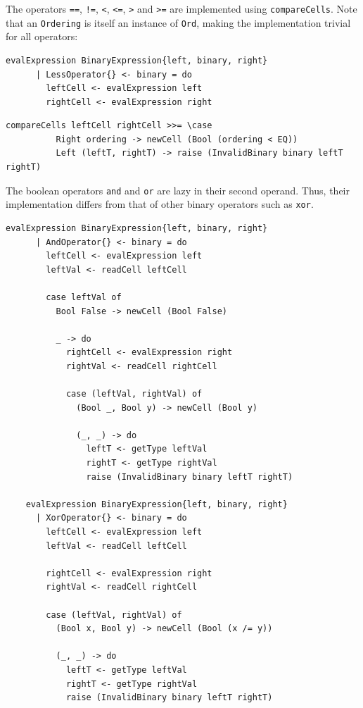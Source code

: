 \documentclass[UdineBachThesis,american,11pt]{PhdThesis}
\begin{document}
  The operators \mbox{\texttt{==}}, \mbox{\texttt{!=}}, \texttt{<},
  \mbox{\texttt{<=}}, \texttt{>} and \mbox{\texttt{>=}} are implemented using
  \mbox{\texttt{compareCells}}. Note that an \mbox{\texttt{Ordering}} is itself
  an instance of \mbox{\texttt{Ord}}, making the implementation trivial for all
  operators:

  \begin{Verbatim}[gobble=4,fontsize=\small]
    evalExpression BinaryExpression{left, binary, right}
      | LessOperator{} <- binary = do
        leftCell <- evalExpression left
        rightCell <- evalExpression right
  \end{Verbatim}

  \pagebreak

  \begin{Verbatim}[gobble=4,fontsize=\small]
        compareCells leftCell rightCell >>= \case
          Right ordering -> newCell (Bool (ordering < EQ))
          Left (leftT, rightT) -> raise (InvalidBinary binary leftT rightT)
  \end{Verbatim}

  The boolean operators \mbox{\texttt{and}} and \mbox{\texttt{or}} are lazy in
  their second operand. Thus, their implementation differs from that of other
  binary operators such as \mbox{\texttt{xor}}.

  \begin{Verbatim}[gobble=4,fontsize=\small]
    evalExpression BinaryExpression{left, binary, right}
      | AndOperator{} <- binary = do
        leftCell <- evalExpression left
        leftVal <- readCell leftCell

        case leftVal of
          Bool False -> newCell (Bool False)

          _ -> do
            rightCell <- evalExpression right
            rightVal <- readCell rightCell

            case (leftVal, rightVal) of
              (Bool _, Bool y) -> newCell (Bool y)

              (_, _) -> do
                leftT <- getType leftVal
                rightT <- getType rightVal
                raise (InvalidBinary binary leftT rightT)

    evalExpression BinaryExpression{left, binary, right}
      | XorOperator{} <- binary = do
        leftCell <- evalExpression left
        leftVal <- readCell leftCell

        rightCell <- evalExpression right
        rightVal <- readCell rightCell

        case (leftVal, rightVal) of
          (Bool x, Bool y) -> newCell (Bool (x /= y))

          (_, _) -> do
            leftT <- getType leftVal
            rightT <- getType rightVal
            raise (InvalidBinary binary leftT rightT)
  \end{Verbatim}
\end{document}
